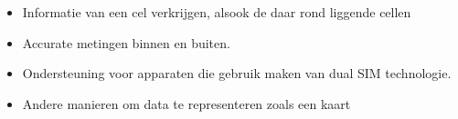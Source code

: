 \begin{itemize}
    \item Informatie van een cel verkrijgen, alsook de daar rond liggende cellen
    \item Accurate metingen binnen en buiten.
    \item Ondersteuning voor apparaten die gebruik maken van dual SIM technologie.
    \item Andere manieren om data te representeren zoals een kaart
\end{itemize}




